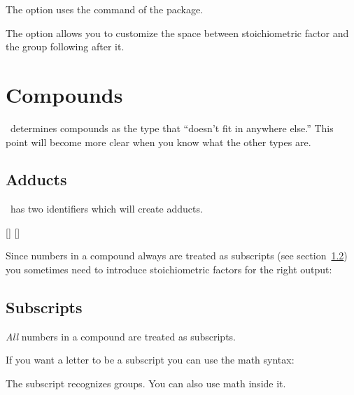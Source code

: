 \documentclass[load-preamble+]{cnltx-doc}
\begin{document}
The option  uses the  command of the
 package.
\begin{example}
   
\end{example}

The option  allows you to customize the space between
stoichiometric factor and the group following after it.
\begin{example}
   \par
\end{example}

\section{Compounds}\label{ssec:compounds}
\chemformula\ determines compounds as the type that ``doesn't fit in anywhere
else.''  This point will become more clear when you know what the other types
are.
\begin{example}
   \par
\end{example}

\subsection{Adducts}
\chemformula\ has two identifiers which will create adducts.
\begin{commands}
  [] 
  [] 
\end{commands}
\begin{example}
   \par
\end{example}
Since numbers in a compound always are treated as subscripts (see
section~\ref{ssec:subscripts}) you sometimes need to introduce stoichiometric
factors for the right output:
\begin{example}
   \par
   \par
\end{example}

\subsection{Subscripts}\label{ssec:subscripts}
\emph{All} numbers in a compound are treated as subscripts.
\begin{example}
\end{example}
If you want a letter to be a subscript you can use the math syntax:
\begin{example}
\end{example}
The subscript recognizes groups. You can also use math inside it.
\begin{example}
   \par
\end{example}
\end{document}
